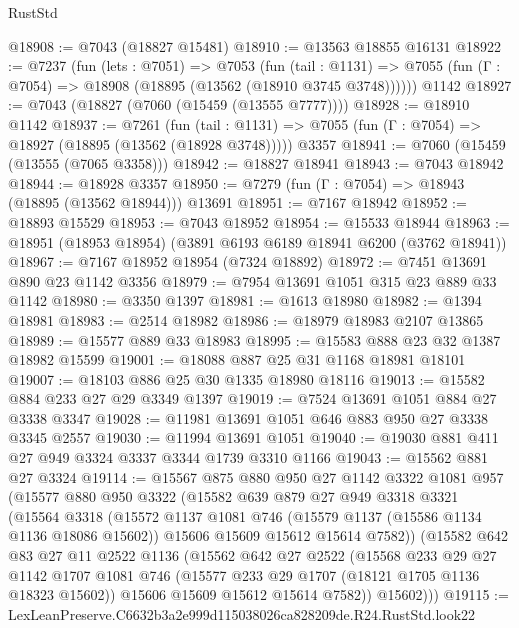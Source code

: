 \begin{lexlean}{RustStd}
\begin{coremodule}
@18908 := @7043 (@18827 @15481)
@18910 := @13563 @18855 @16131
@18922 := @7237
    (fun (lets : @7051) =>
    @7053
      (fun (tail : @1131) =>
      @7055 (fun (Γ : @7054) => @18908 (@18895 (@13562 (@18910 @3745 @3748))))))
    @1142
@18927 := @7043 (@18827 (@7060 (@15459 (@13555 @7777))))
@18928 := @18910 @1142
@18937 := @7261
    (fun (tail : @1131) => @7055 (fun (Γ : @7054) => @18927 (@18895 (@13562 (@18928 @3748)))))
    @3357
@18941 := @7060 (@15459 (@13555 (@7065 @3358)))
@18942 := @18827 @18941
@18943 := @7043 @18942
@18944 := @18928 @3357
@18950 := @7279 (fun (Γ : @7054) => @18943 (@18895 (@13562 @18944))) @13691
@18951 := @7167 @18942
@18952 := @18893 @15529
@18953 := @7043 @18952
@18954 := @15533 @18944
@18963 := @18951 (@18953 @18954) (@3891 @6193 @6189 @18941 @6200 (@3762 @18941))
@18967 := @7167 @18952 @18954 (@7324 @18892)
@18972 := @7451 @13691 @890 @23 @1142 @3356
@18979 := @7954 @13691 @1051 @315 @23 @889 @33 @1142
@18980 := @3350 @1397
@18981 := @1613 @18980
@18982 := @1394 @18981
@18983 := @2514 @18982
@18986 := @18979 @18983 @2107 @13865
@18989 := @15577 @889 @33 @18983
@18995 := @15583 @888 @23 @32 @1387 @18982 @15599
@19001 := @18088 @887 @25 @31 @1168 @18981 @18101
@19007 := @18103 @886 @25 @30 @1335 @18980 @18116
@19013 := @15582 @884 @233 @27 @29 @3349 @1397
@19019 := @7524 @13691 @1051 @884 @27 @3338 @3347
@19028 := @11981 @13691 @1051 @646 @883 @950 @27 @3338 @3345 @2557
@19030 := @11994 @13691 @1051
@19040 := @19030 @881 @411 @27 @949 @3324 @3337 @3344 @1739 @3310 @1166
@19043 := @15562 @881 @27 @3324
@19114 := @15567
    @875
    @880
    @950
    @27
    @1142
    @3322
    @1081
    @957
    (@15577
      @880
      @950
      @3322
      (@15582
        @639
        @879
        @27
        @949
        @3318
        @3321
        (@15564
          @3318
          (@15572
            @1137
            @1081
            @746
            (@15579 @1137 (@15586 @1134 @1136 @18086 @15602))
            @15606
            @15609
            @15612
            @15614
            @7582))
        (@15582
          @642
          @83
          @27
          @11
          @2522
          @1136
          (@15562
            @642
            @27
            @2522
            (@15568
              @233
              @29
              @27
              @1142
              @1707
              @1081
              @746
              (@15577 @233 @29 @1707 (@18121 @1705 @1136 @18323 @15602))
              @15606
              @15609
              @15612
              @15614
              @7582))
          @15602)))
@19115 := LexLeanPreserve.C6632b3a2e999d115038026ca828209de.R24.RustStd.look22

\end{coremodule}
\end{lexlean}
